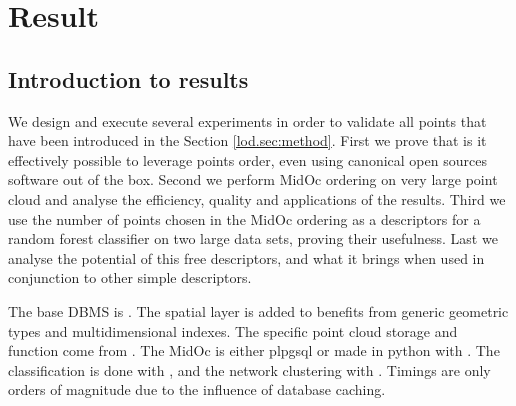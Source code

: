 

 \section{ Result }
	 \label{lod.sec:result}
 	\subsection{Introduction to results}
 		We design and execute several experiments in order to validate all points that have been introduced in the Section \ref{lod.sec:method}.
 		First we prove that is it effectively possible to leverage points order, even using canonical open sources software out of the box.
 		Second we perform MidOc ordering on very large point cloud and analyse the efficiency, quality and applications of the results.
 		Third we use the number of points chosen in the MidOc ordering as a descriptors for a random forest classifier on two large data sets, proving their usefulness.
 		Last we analyse the potential of this free descriptors, and what it brings when used in conjunction to other simple descriptors.
 		
 		The base DBMS is \cite{PostgreSQL2014}. The spatial layer \cite{PostGIS2014} is added to benefits from generic geometric types and multidimensional indexes. The specific point cloud storage and function come from \cite{pgPointCloud2014}. 
 		The MidOc is either plpgsql or made in python with \cite{SciPy2014}. 
 		The classification is done with \cite{scikit-image}, and the network clustering with \cite{Networkx2014}.
 		Timings are only orders of magnitude due to the influence of database caching.
 	
	 

